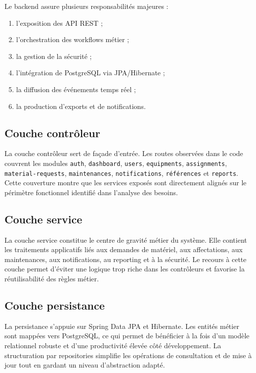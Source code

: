 ﻿\documentclass[12pt,a4paper,oneside]{report}
\begin{document}
Le backend assure plusieurs responsabilités majeures :
\begin{enumerate}
  \item l'exposition des API REST ;
  \item l'orchestration des workflows métier ;
  \item la gestion de la sécurité ;
  \item l'intégration de PostgreSQL via JPA/Hibernate ;
  \item la diffusion des événements temps réel ;
  \item la production d'exports et de notifications.
\end{enumerate}

\subsection{Couche contrôleur}
La couche contrôleur sert de façade d'entrée. Les routes observées dans le code couvrent les modules \texttt{auth}, \texttt{dashboard}, \texttt{users}, \texttt{equipments}, \texttt{assignments}, \texttt{material-requests}, \texttt{maintenances}, \texttt{notifications}, \texttt{références} et \texttt{reports}. Cette couverture montre que les services exposés sont directement alignés sur le périmètre fonctionnel identifié dans l'analyse des besoins.

\subsection{Couche service}
La couche service constitue le centre de gravité métier du système. Elle contient les traitements applicatifs liés aux demandes de matériel, aux affectations, aux maintenances, aux notifications, au reporting et à la sécurité. Le recours à cette couche permet d'éviter une logique trop riche dans les contrôleurs et favorise la réutilisabilité des règles métier.

\subsection{Couche persistance}
La persistance s'appuie sur Spring Data JPA et Hibernate. Les entités métier sont mappées vers PostgreSQL, ce qui permet de bénéficier à la fois d'un modèle relationnel robuste et d'une productivité élevée côté développement. La structuration par repositories simplifie les opérations de consultation et de mise à jour tout en gardant un niveau d'abstraction adapté.
\end{document}
